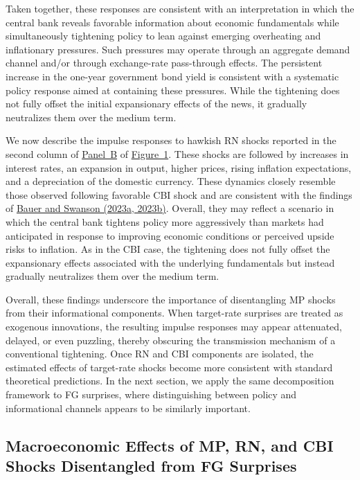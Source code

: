 \documentclass[\latexroot/\projectname]{subfiles}
\begin{document}
Taken together, these responses are consistent with an interpretation in which the central bank reveals favorable information about economic fundamentals while simultaneously tightening policy to lean against emerging overheating and inflationary pressures. Such pressures may operate through an aggregate demand channel and/or through exchange-rate pass-through effects. The persistent increase in the one-year government bond yield is consistent with a systematic policy response aimed at containing these pressures. While the tightening does not fully offset the initial expansionary effects of the news, it gradually neutralizes them over the medium term.

We now describe the impulse responses to hawkish RN shocks reported in the second column of \hyperlink{Panel BF1}{Panel~B} of \hyperlink{Figure~1}{Figure~1}. These shocks are followed by increases in interest rates, an expansion in output, higher prices, rising inflation expectations, and a depreciation of the domestic currency. These dynamics closely resemble those observed following favorable CBI shock and are consistent with the findings of \hyperlink{Bauer and Swanson (2023a, 2023b)}{Bauer and Swanson (2023a, 2023b)}. Overall, they may reflect a scenario in which the central bank tightens policy more aggressively than markets had anticipated in response to improving economic conditions or perceived upside risks to inflation. As in the CBI case, the tightening does not fully offset the expansionary effects associated with the underlying fundamentals but instead gradually neutralizes them over the medium term. 

Overall, these findings underscore the importance of disentangling MP shocks from their informational components. When target-rate surprises are treated as exogenous innovations, the resulting impulse responses may appear attenuated, delayed, or even puzzling, thereby obscuring the transmission mechanism of a conventional tightening. Once RN and CBI components are  isolated, the estimated effects of target-rate shocks become more consistent with standard theoretical predictions. In the next section, we apply the same decomposition framework to FG surprises, where distinguishing between policy and informational channels appears to be similarly important.




\subsection{Macroeconomic Effects of MP, RN, and CBI Shocks Disentangled from FG Surprises}
\end{document}
